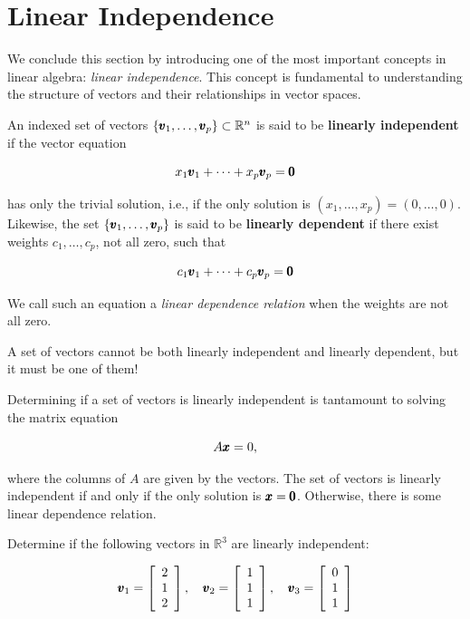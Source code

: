 \section{Linear Independence}
We conclude this section by introducing one of the most important concepts in linear algebra: \textit{linear independence}. This concept is fundamental to understanding the structure of vectors and their relationships in vector spaces.

\begin{definition}
    An indexed set of vectors $\left\{\pmb{v}_1, \ldots, \pmb{v}_p\right\} \subset \mathbb{R}^n$ is said to be \textbf{linearly independent} if the vector equation
    
    \[
    x_1 \pmb{v}_1 + \cdots + x_p \pmb{v}_p = \pmb{0}
    \]
    
    has only the trivial solution, i.e., if the only solution is $\left(x_1, \ldots, x_p\right) = (0, \ldots, 0)$. Likewise, the set $\left\{\pmb{v}_1, \ldots, \pmb{v}_p\right\}$ is said to be \textbf{linearly dependent} if there exist weights $c_1, \ldots, c_p$, not all zero, such that
    
    \[
    c_1 \pmb{v}_1 + \cdots + c_p \pmb{v}_p = \pmb{0}
    \]
    
    We call such an equation a \textit{linear dependence relation} when the weights are not all zero.
\end{definition}
    
    \begin{remark}
        A set of vectors cannot be both linearly independent and linearly dependent, but it must be one of them!
    \end{remark}

    Determining if a set of vectors is linearly independent is tantamount to solving the matrix equation

    \[
    A \pmb{x}=0,
    \]

where the columns of $A$ are given by the vectors. The set of vectors is linearly independent if and only if the only solution is $\pmb{x}=\pmb{0}$. Otherwise, there is some linear dependence relation.

    \begin{example}
        Determine if the following vectors in $\mathbb{R}^3$ are linearly independent:

        \[
        \pmb{v}_1 = \left[\begin{array}{l}
        2 \\
        1 \\
        2
        \end{array}\right], \quad \pmb{v}_2 = \left[\begin{array}{l}
        1 \\
        1 \\
        1
        \end{array}\right], \quad \pmb{v}_3 = \left[\begin{array}{l}
        0 \\
        1 \\
        1
        \end{array}\right]
        \]
    \end{example}

